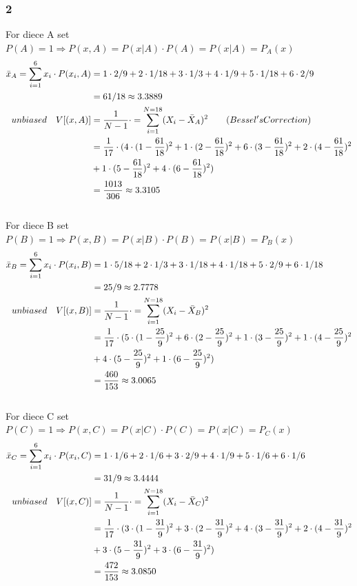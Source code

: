 \documentclass{article}
\begin{document}
\subsubsection*{2}
For diece A set $P(A)=1 \Rightarrow P(x,A) = P(x|A)\cdot P(A)=P(x|A)=P_A(x)$
\begin{equation}\notag
\begin{aligned} 
\bar x_A = \sum\limits_{i=1}^{6}x_i\cdot P(x_i,A)&=1\cdot 2/9+2\cdot 1/18 +3\cdot 1/3 + 4\cdot 1/9 +5\cdot 1/18 +6\cdot 2/9\\
&= 61/18 \approx 3.3889
\\
unbiased \quad V[(x,A)]&=\frac{1}{N-1}  \cdot  = \sum\limits_{i=1}^{N=18}(X_i-\bar X_A)^2 \qquad (Bessel's Correction)\\
&=\frac{1}{17}\cdot (4\cdot(1-\frac{61}{18})^2+1\cdot(2-\frac{61}{18})^2+6\cdot(3-\frac{61}{18})^2+2\cdot(4-\frac{61}{18})^2
\\&+1\cdot(5-\frac{61}{18})^2+4\cdot(6-\frac{61}{18})^2)\\
&=\frac{1013}{306}  \approx 3.3105
\end{aligned}
\end{equation}
\\[15pt]
For diece B set $P(B)=1 \Rightarrow P(x,B) = P(x|B)\cdot P(B)=P(x|B)=P_B(x)$
\begin{equation}\notag
\begin{aligned} 
\bar x_B = \sum\limits_{i=1}^{6}x_i\cdot P(x_i,B)&=1\cdot 5/18+2\cdot 1/3 +3\cdot 1/18 + 4\cdot 1/18 +5\cdot 2/9 +6\cdot 1/18\\
&= 25/9 \approx 2.7778
\\
unbiased \quad V[(x,B)]&=\frac{1}{N-1}  \cdot  = \sum\limits_{i=1}^{N=18}(X_i-\bar X_B)^2 \qquad \\
&=\frac{1}{17}\cdot (5\cdot(1-\frac{25}{9})^2+6\cdot(2-\frac{25}{9})^2+1\cdot(3-\frac{25}{9})^2+1\cdot(4-\frac{25}{9})^2
\\&+4\cdot(5-\frac{25}{9})^2+1\cdot(6-\frac{25}{9})^2)\\
&=\frac{460}{153}  \approx 3.0065
\end{aligned}
\end{equation}
\\[15pt]
For diece C set $P(C)=1 \Rightarrow P(x,C) = P(x|C)\cdot P(C)=P(x|C)=P_C(x)$
\begin{equation}\notag
\begin{aligned} 
\bar x_C = \sum\limits_{i=1}^{6}x_i\cdot P(x_i,C)&=1\cdot 1/6+2\cdot 1/6 +3\cdot 2/9 + 4\cdot 1/9 +5\cdot 1/6 +6\cdot 1/6\\
&=31/9 \approx 3.4444
\\
unbiased \quad V[(x,C)]&=\frac{1}{N-1}  \cdot  = \sum\limits_{i=1}^{N=18}(X_i-\bar X_C)^2 \qquad \\
&=\frac{1}{17}\cdot (3\cdot(1-\frac{31}{9})^2+3\cdot(2-\frac{31}{9})^2+4\cdot(3-\frac{31}{9})^2+2\cdot(4-\frac{31}{9})^2
\\&+3\cdot(5-\frac{31}{9})^2+3\cdot(6-\frac{31}{9})^2)\\
&=\frac{472}{153}  \approx 3.0850
\end{aligned}
\end{equation}
\end{document}
